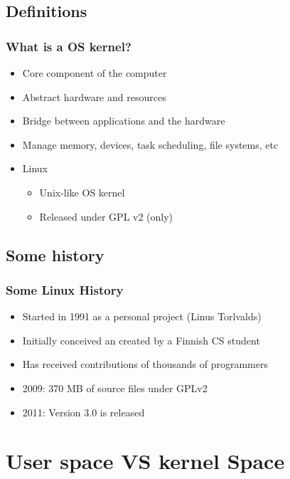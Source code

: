 \documentclass{beamer}
\begin{document}
\subsection{Definitions}

\begin{frame}
\frametitle{What is a OS kernel?}

\begin{itemize}
\item Core component of the computer
\item Abstract hardware and resources
\item Bridge between applications and the hardware
\item Manage memory, devices, task scheduling, file systems, etc
\item Linux
   \begin{itemize}
   \item Unix-like OS kernel
   \item Released under GPL v2 (only)
   \end{itemize}

\end{itemize}
\end{frame}



\subsection{Some history}

\begin{frame}
\frametitle{Some Linux History}

\begin{itemize}
\item Started in 1991 as a personal project (Linus Torlvalds)
\item Initially conceived an created by a Finnish CS student
\item Has received contributions of thousands of programmers
\item 2009: 370 MB of source files under GPLv2
\item 2011: Version 3.0 is released
\end{itemize}

\end{frame}



\section{User space VS kernel Space}
\end{document}
